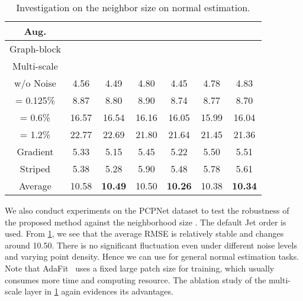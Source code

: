 \documentclass[runningheads]{llncs}
\begin{document}
\begin{table}[!htbp]
\caption{Investigation on the neighbor size  on normal estimation.}
\begin{center}
\begin{tabular}{@{}ccccccc@{}}
\toprule
\textbf{Aug.}        & \multicolumn{2}{c}{}                           & \multicolumn{2}{c}{}                           & \multicolumn{2}{c}{}                           \\ \midrule
Graph-block &  &  &  &  &  &  \\
Multi-scale &                         &  &                         &  &                         &  \\
w/o Noise    & 4.56                    & 4.49                    & 4.80                    & 4.45                    & 4.78                    & 4.83                    \\
 = 0.125\%   & 8.87                    & 8.80                    & 8.90                    & 8.74                   & 8.77                    & 8.70                    \\
 = 0.6\%   & 16.57                   & 16.54                   & 16.16                   & 16.05                   & 15.99                   & 16.04                   \\
 = 1.2\%  & 22.77                   & 22.69                   & 21.80                   & 21.64                   & 21.45                   & 21.36                   \\
Gradient    & 5.33                    & 5.15                    & 5.45                    & 5.22                    & 5.50                    & 5.51                    \\
Striped       & 5.38                    & 5.28                    & 5.90                    & 5.48                    & 5.78                    & 5.61                    \\
Average     & 10.58                   & \textbf{10.49}                   & 10.50                   & \textbf{10.26}                   & 10.38                   & \textbf{10.34}                   \\ \bottomrule
\end{tabular}
\label{tab:scale}
\end{center}
\end{table}

We also conduct experiments on the PCPNet dataset to test the robustness of the proposed method against the neighborhood size . The default Jet order  is used. From \cref{tab:scale}, we see that the average RMSE is relatively stable and changes around 10.50. There is no significant fluctuation even under different noise levels and varying point density. Hence we can use  for general normal estimation tasks. Note that AdaFit~\cite{zhu2021adafit} uses a fixed large patch size  for training, which usually consumes more time and computing resource. The ablation study of  the multi-scale layer in \cref{tab:scale} again evidences its advantages. 
\end{document}
